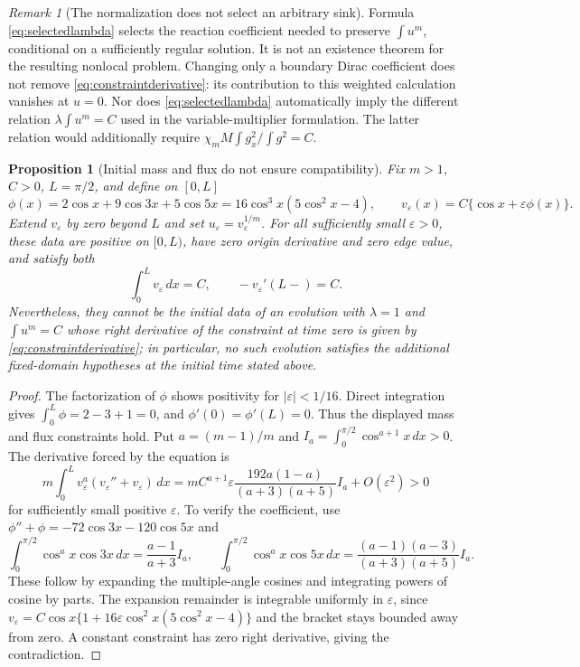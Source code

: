 \documentclass[11pt,a4paper]{article}
\newtheorem{proposition}[theorem]{Proposition}
\theoremstyle{remark}\newtheorem{remark}[theorem]{Remark}
\begin{document}
\begin{remark}[The normalization does not select an arbitrary sink]
Formula \eqref{eq:selectedlambda} selects the reaction coefficient
needed to preserve $\int u^m$, conditional on a sufficiently regular
solution. It is not an existence theorem for the resulting nonlocal
problem. Changing only a boundary Dirac coefficient does not remove
\eqref{eq:constraintderivative}: its contribution to this weighted
calculation vanishes at $u=0$. Nor does
\eqref{eq:selectedlambda} automatically imply the different relation
$\lambda\int u^m=C$ used in the variable-multiplier formulation.
The latter relation would additionally require
$\chi_m M\int g_x^2/\int g^2=C$.
\end{remark}

\begin{proposition}[Initial mass and flux do not ensure compatibility]\label{prop:initialobstruction}
Fix $m>1$, $C>0$, $L=\pi/2$, and define on $[0,L]$
\[
 \phi(x)=2\cos x+9\cos3x+5\cos5x
         =16\cos^3x(5\cos^2x-4),
 \qquad v_\varepsilon(x)=C\{\cos x+\varepsilon\phi(x)\}.
\]
Extend $v_\varepsilon$ by zero beyond $L$ and set
$u_\varepsilon=v_\varepsilon^{1/m}$.
For all sufficiently small $\varepsilon>0$, these data are positive
on $[0,L)$, have zero origin derivative and zero edge value, and satisfy
both
\[
 \int_0^L v_\varepsilon\,dx=C,
 \qquad -v_\varepsilon'(L-)=C.
\]
Nevertheless, they cannot be the initial data of an evolution with
$\lambda=1$ and $\int u^m=C$ whose right derivative of the constraint
at time zero is given by \eqref{eq:constraintderivative}; in particular,
no such evolution satisfies the additional fixed-domain hypotheses at
the initial time stated above.
\end{proposition}
\begin{proof}
The factorization of $\phi$ shows positivity for $|\varepsilon|<1/16$.
Direct integration gives $\int_0^L\phi=2-3+1=0$, and
$\phi'(0)=\phi'(L)=0$. Thus the displayed mass and flux constraints hold.
Put $a=(m-1)/m$ and $I_a=\int_0^{\pi/2}\cos^{a+1}x\,dx>0$.
The derivative forced by the equation is
\[
 m\int_0^L v_\varepsilon^a
          (v_\varepsilon''+v_\varepsilon)\,dx
 =mC^{a+1}\varepsilon
       \frac{192a(1-a)}{(a+3)(a+5)}I_a+O(\varepsilon^2)>0
\]
for sufficiently small positive $\varepsilon$.
To verify the coefficient, use
$\phi''+\phi=-72\cos3x-120\cos5x$ and
\[
 \int_0^{\pi/2}\cos^a x\cos3x\,dx
    =\frac{a-1}{a+3}I_a,\qquad
 \int_0^{\pi/2}\cos^a x\cos5x\,dx
    =\frac{(a-1)(a-3)}{(a+3)(a+5)}I_a.
\]
These follow by expanding the multiple-angle cosines and integrating
powers of cosine by parts. The expansion remainder is integrable
uniformly in $\varepsilon$, since
$v_\varepsilon=C\cos x\{1+16\varepsilon\cos^2x(5\cos^2x-4)\}$
and the bracket stays bounded away from zero.
A constant constraint has zero right derivative, giving the contradiction.
\end{proof}
\end{document}
